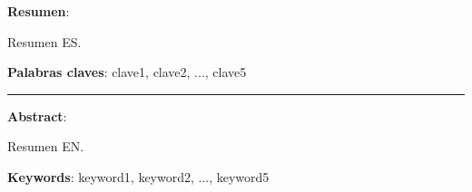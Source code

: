 \textbf{Resumen}:

Resumen ES.

\textbf{Palabras claves}: clave1, clave2, ..., clave5
\vspace{1cm}
\begin{center}
  \rule{0.5\textwidth}{.4pt}
\end{center}
\vspace{1cm}
\textbf{Abstract}:

Resumen EN.

\textbf{Keywords}: keyword1, keyword2, ..., keyword5
